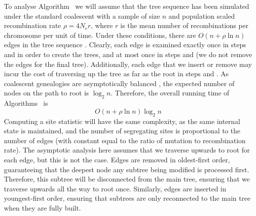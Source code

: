\documentclass{article}
\begin{document}
To analyse Algorithm~ we will assume that the tree sequence has
been simulated under the standard coalescent with a sample of size
$n$ and population scaled recombination rate $\rho = 4 N_e r$,
where $r$ is the mean number of recombinations per chromosome per unit of time.
Under these conditions, there are $O(n + \rho \ln n)$ edges in the tree sequence
\citep{kelleher2016efficient}.  Clearly, each edge is examined
exactly once in steps  and  in order to create
the trees, and at most once in steps  and  (we do
not remove the edges for the final tree). Additionally, each edge that
we insert or remove may incur the cost of traversing up the tree as
far as the root in steps  and .
As coalescent genealogies are asymptotically
balanced \citep{li2013coalescent}, the expected number of nodes
on the path to root is $\log_2 n$. Therefore, the overall running time
of Algorithms~ is
\[
O(n + \rho \ln n) \log_2 n
\]
Computing a site statistic will have the same complexity,
as the same internal state is maintained,
and the number of segregating sites is proportional to the number of edges
(with constant equal to the ratio of mutation to recombination rate).
The asymptotic analysis here assumes that we traverse upwards to root
for each edge, but this is not the case. Edges are removed in
oldest-first order, guaranteeing that the deepest node any subtree being
modified is processed first. Therefore, this subtree will be disconnected from the
main tree, ensuring that we traverse upwards all the way to root once. Similarly,
edges are inserted in youngest-first order, ensuring that subtrees are only
reconnected to the main tree when they are fully built.
\end{document}
